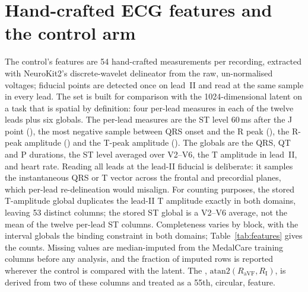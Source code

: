 \section[Features and the control arm]{Hand-crafted ECG features and the control arm}
\label{sec:features}

The control's features are 54 hand-crafted measurements per recording, extracted with NeuroKit2's discrete-wavelet delineator from the raw, un-normalised voltages; fiducial points are detected once on lead~II and read at the same sample in every lead. 
The set is built for comparison with the 1024-dimensional latent on a task that is spatial by definition: four per-lead measures in each of the twelve leads plus six globals. The per-lead measures are the ST level 60\,ms after the J point (\STblock), the most negative sample between QRS onset and the R peak (\Qblock), the R-peak amplitude (\Rblock) and the T-peak amplitude (\Tblock). The globals are the QRS, QT and P durations, the ST level averaged over V2--V6, the T amplitude in lead~II, and heart rate. Reading all leads at the lead-II fiducial is deliberate: it samples the instantaneous QRS or T vector across the frontal and precordial planes, which per-lead re-delineation would misalign.  For counting purposes, the stored T-amplitude global duplicates the lead-II T amplitude exactly in both domains, leaving 53 distinct columns; the stored ST global is a V2--V6 average, not the mean of the twelve per-lead ST columns.  Completeness varies by block, with the interval globals the binding constraint in both domains; Table~\ref{tab:features} gives the counts. Missing values are median-imputed from the MedalCare training columns before any analysis, and the fraction of imputed rows is reported wherever the control is compared with the latent. The \axisfeat, $\mathrm{atan2}(R_{\mathrm{aVF}}, R_{\mathrm{I}})$, is derived from two of these columns and treated as a 55th, circular, feature. 

